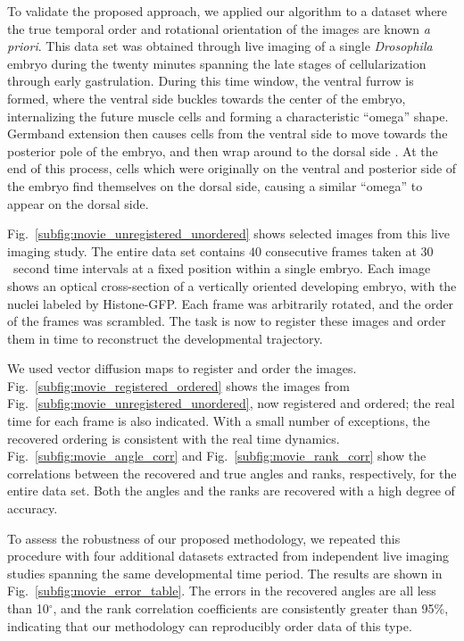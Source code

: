 \documentclass{pnastwo}
\newcommand{\fig}[0]{Fig.}
\begin{document}
\begin{article}
To validate the proposed approach, we applied our algorithm to a dataset where the true temporal order and rotational orientation of the images are known {\em a priori}.
%
This data set was obtained through live imaging of a single {\it Drosophila} embryo during the twenty minutes spanning the late stages of cellularization through early gastrulation.
%
During this time window, the ventral furrow is formed, where the ventral side buckles towards the center of the embryo, internalizing the future muscle cells and forming a characteristic ``omega'' shape.
%
Germband extension then causes cells from the ventral side to move towards the posterior pole of the embryo, and then wrap around to the dorsal side \cite{leptin2005gastrulation}.
%
At the end of this process, cells which were originally on the ventral and posterior side of the embryo find themselves on the dorsal side, causing a similar ``omega'' to appear on the dorsal side.

\fig~\ref{subfig:movie_unregistered_unordered} shows selected images from this live imaging study. 
%
The entire data set contains $40$ consecutive frames taken at $30$~second time intervals at a fixed position within a single embryo.
%
Each image shows an optical cross-section of a vertically oriented developing embryo, with the nuclei labeled by Histone-GFP.
%
Each frame was arbitrarily rotated, and the order of the frames was scrambled.
%
The task is now to register these images and order them in time to reconstruct the developmental trajectory.

We used vector diffusion maps to register and order the images. 
%
\fig~\ref{subfig:movie_registered_ordered} shows the images from \fig~\ref{subfig:movie_unregistered_unordered}, now registered and ordered; the real time for each frame is also indicated.
%
With a small number of exceptions, the recovered ordering is consistent with the real time dynamics. 
%
\fig~\ref{subfig:movie_angle_corr} and \fig~\ref{subfig:movie_rank_corr}  show the correlations between the recovered and true angles and ranks, respectively, for the entire data set. 
%
Both the angles and the ranks are recovered with a high degree of accuracy.

To assess the robustness of our proposed methodology, we repeated this procedure with four additional datasets extracted from independent live imaging studies spanning the same developmental time period. 
%
The results are shown in \fig~\ref{subfig:movie_error_table}. 
%
The errors in the recovered angles are all less than 10$^\circ$, and the rank correlation coefficients are consistently greater than 95\%, indicating that our methodology can reproducibly order data of this type. 


\end{article}
\end{document}
